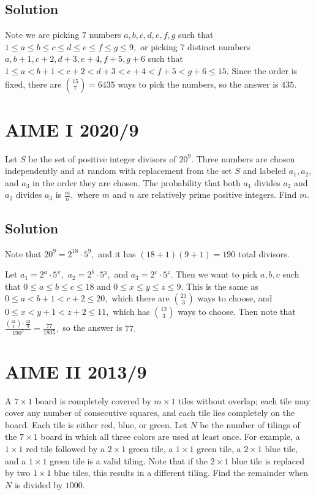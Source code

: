 \documentclass{article}
\begin{document}
\subsection{Solution}
Note we are picking $7$ numbers $a,b,c,d,e,f,g$ such that $1\leq a\leq b\leq c\leq d\leq e\leq f\leq g\leq 9,$ or picking $7$ distinct numbers $a,b+1,c+2,d+3,e+4,f+5,g+6$ such that $1\leq a< b+1< c+2< d+3< e+4< f+5< g+6\leq 15.$ Since the order is fixed, there are $\binom{15}{7}=6435$ ways to pick the numbers, so the answer is $435.$

\pagebreak\section{AIME I 2020/9}
Let $S$ be the set of positive integer divisors of $20^9.$ Three numbers are chosen independently and at random with replacement from the set $S$ and labeled $a_1,a_2,$ and $a_3$ in the order they are chosen. The probability that both $a_1$ divides $a_2$ and $a_2$ divides $a_3$ is $\tfrac{m}{n},$ where $m$ and $n$ are relatively prime positive integers. Find $m.$

\subsection{Solution}
Note that $20^9=2^{18}\cdot 5^9,$ and it has $(18+1)(9+1)=190$ total divisors.
    
Let $a_1=2^a\cdot 5^x,$ $a_2=2^b\cdot 5^y,$ and $a_3=2^c\cdot 5^z.$ Then we want to pick $a,b,c$ such that $0\leq a\leq b\leq c\leq 18$ and $0\leq x\leq y\leq z\leq 9.$ This is the same as $0\leq a<b+1<c+2\leq 20,$ which there are $\binom{21}{3}$ ways to choose, and $0\leq x<y+1<z+2\leq 11,$ which has $\binom{12}{3}$ ways to choose. Then note that $\frac{\binom{21}{3}\cdot\frac{12}{3}}{190^3}=\frac{77}{1805},$ so the answer is $77.$

\pagebreak\section{AIME II 2013/9}
A $7\times 1$ board is completely covered by $m\times 1$ tiles without overlap; each tile may cover any number of consecutive squares, and each tile lies completely on the board. Each tile is either red, blue, or green. Let $N$ be the number of tilings of the $7\times 1$ board in which all three colors are used at least once. For example, a $1\times 1$ red tile followed by a $2\times 1$ green tile, a $1\times 1$ green tile, a $2\times 1$ blue tile, and a $1\times 1$ green tile is a valid tiling. Note that if the $2\times 1$ blue tile is replaced by two $1\times 1$ blue tiles, this results in a different tiling. Find the remainder when $N$ is divided by $1000$.
\end{document}
